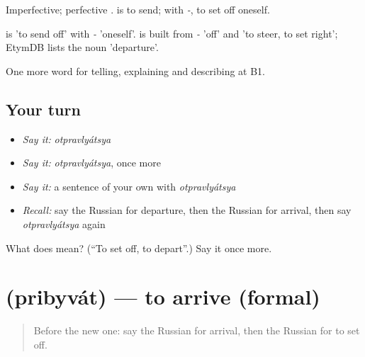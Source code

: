 Imperfective; perfective \emph{}. \emph{} is to send; with \emph{-}, to set off oneself.

\begin{cousinweb}
\emph{} is \emph{} 'to send off' with \emph{-} 'oneself'. \emph{} is built from \emph{-} 'off' and \emph{} 'to steer, to set right'; EtymDB lists the noun \emph{} 'departure'.
\end{cousinweb}

\begin{grammarlens}[title={What you've built}]
One more word for telling, explaining and describing at B1.
\end{grammarlens}

\subsection*{Your turn}
\begin{itemize}
\raggedright
  \item \emph{Say it:} \emph{otpravlyátsya}
  \item \emph{Say it:} \emph{otpravlyátsya}, once more
  \item \emph{Say it:} a sentence of your own with \emph{otpravlyátsya}
  \item \emph{Recall:} say the Russian for departure, then the Russian for arrival, then say \emph{otpravlyátsya} again
\end{itemize}

\begin{tcolorbox}[breakable,colback=teal!4,colframe=teal!35!black,title={Before you move on}]
What does  mean? (\textquotedblleft{}To set off, to depart\textquotedblright{}.) Say it once more.
\end{tcolorbox}
\section[\texorpdfstring{\ru{прибывать} (pribyvát)}{прибывать (pribyvát)}]{ (pribyvát) — to arrive (formal)}

\label{lesson:RU-C415-pribyvat}



\begin{quote}
Before the new one: say the Russian for arrival, then the Russian for to set off.
\end{quote}

